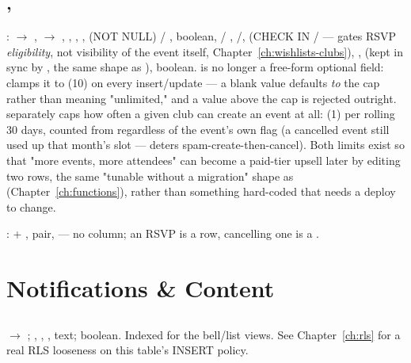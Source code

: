 \subsection*{, }
:  $\to$ ,  $\to$ , , , ,  (NOT NULL) / ,  boolean,  / , /,  (CHECK IN / — gates RSVP \emph{eligibility}, not visibility of the event itself, Chapter~\ref{ch:wishlists-clubs}), ,  (kept in sync by , the same shape as ),  boolean.  is no longer a free-form optional field:  clamps it to  (10) on every insert/update — a blank value defaults \emph{to} the cap rather than meaning "unlimited," and a value above the cap is rejected outright.  separately caps how often a given club can create an event at all:  (1) per rolling 30 days, counted from  regardless of the event's own  flag (a cancelled event still used up that month's slot — deters spam-create-then-cancel). Both limits exist so that "more events, more attendees" can become a paid-tier upsell later by editing two  rows, the same "tunable without a migration" shape as  (Chapter~\ref{ch:functions}), rather than something hard-coded that needs a deploy to change.

:  + ,  pair,  — no  column; an RSVP is a row, cancelling one is a .

\section{Notifications \& Content}

\subsection*{}
 $\to$ ; , , ,  text;  boolean. Indexed  for the bell/list views. See Chapter~\ref{ch:rls} for a real RLS looseness on this table's INSERT policy.

